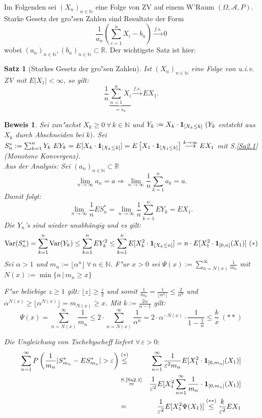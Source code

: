 \documentclass[a4paper,11pt]{book}
\newcommand{\R}{{\mathbb R}}
\newcommand{\N}{{\mathbb N}}
\newcommand{\ind}{\text{\bf{1}}}
\newcommand{\eps}{\varepsilon}
\DeclareMathOperator{\var}{Var}
\def\AA{ \mathcal{A} }
\def\fs{\stackrel{f.s.}{\rightarrow }}
\newtheorem{Sa}{Satz}[chapter]
\theoremstyle{nonumberplain}
\newtheorem{Bew}{Beweis}
\begin{document}
Im Folgenden sei $(X_n)_{n \in \N}$ eine Folge von ZV auf einem W'Raum $(\Omega,\AA,P)$. Starke Gesetz der gro"sen Zahlen sind Resultate der Form
\[
\frac1{a_n} \left( \sum_{i = 1}^{n} X_i -b_n \right) \fs 0
\]
wobei $(a_n)_{n \in \N}, (b_n)_{n \in \N} \subset \R$. Der wichtigste Satz ist hier:

\begin{Sa}[Starkes Gesetz der gro"sen Zahlen] \label{Sa4.2}
Ist $(X_n)_{n \in \N}$ eine Folge von u.i.v. ZV mit $E|X_1| < \infty$, so gilt:
\[
\frac1{n} \underbrace{\sum_{n=1}^n X_i}_{=s_n} \fs EX_1.
\]
\end{Sa}

\begin{Bew}
Sei zun"achst $X_k \geq 0\ \forall\, k \in \N$ und $Y_k := X_k \cdot \ind_{[X_k \leq k]}\ (Y_k$ entsteht aus $X_k$ durch Abschneiden bei $k)$. Sei $S_n^{\ast} := \sum_{k=1}^n Y_k\ EY_k = E[X_k \cdot \ind_{[X_k \leq k]}] = E\left[X_1 \cdot \ind_{[X_1 \leq k]}\right] \stackrel{k \rightarrow \infty}{\longrightarrow} EX_1$ mit S.\ref{Sa2.1} (Monotone Konvergenz).\\
Aus der Analysis: Sei $(a_n)_{n \in \N} \subset \R$
\[
\lim_{n \rightarrow \infty} a_n = a \Rightarrow \lim_{n \rightarrow \infty} \frac1{n} \sum_{k=1}^n a_k = a.
\]
Damit folgt:
\[
\lim_{n \rightarrow \infty} \frac1{n} E S_n^{\ast} = \lim_{n \rightarrow \infty} \frac1{n} \sum_{k=1}^n E Y_k = E X_1.
\]
Die $Y_n$'s sind wieder unabhängig und es gilt:
\[
\var(S_n^{\ast}) = \sum_{k=1}^n \var(Y_k) \leq \sum_{k=1}^n EY_k^2 \leq \sum_{k=1}^n E[X_k^2 \cdot \ind_{[X_k \leq n]}] = n \cdot E[X_1^2 \cdot \ind_{[0,n]}(X_1)] \ (\ast)
\]
Sei $\alpha > 1$ und $m_n := \lfloor \alpha^n \rfloor \ \forall\, n \in \N$. F"ur $x > 0$ sei $\Psi(x) := \sum_{n = N(x)}^{\infty} \frac1{m_n}$ mit $N(x) := \min\{ n \, | \, m_n \geq x \}$

F"ur beliebige $z \geq 1$ gilt: $\lfloor z \rfloor \geq \frac{z}2$ und somit $\frac1{m_n} = \frac1{\lfloor \alpha^n \rfloor} \leq \frac2{\alpha^n}$ und $\alpha^{N(x)} \geq \lfloor \alpha^{N(x)} \rfloor = m_{N(x)} \geq x$. Mit $k := \frac{2\alpha}{\alpha-1}$ gilt:
\[
\Psi(x) = \sum_{n=N(x)}^{\infty} \frac1{m_n} \leq 2 \cdot \sum_{n=N(x)}^{\infty} \frac1{\alpha^n} = 2 \cdot \alpha^{-N(x)} \cdot \frac1{1-\frac1{\alpha}} \leq \frac{k}{x} \ (\ast \ast)
\]

Die Ungleichung von Tschebyscheff liefert $\forall\, \eps > 0:$
\begin{eqnarray*}
\sum_{n=1}^{\infty} P\left( \frac1{m_n} | S_{m_n}^{\ast} - E S_{m_n}^{\ast} | > \eps \right) & \stackrel{(\ast)}{\leq} & \sum_{n=1}^{\infty} \frac1{\eps^2 m_n} E[X_1^2 \cdot \ind_{[0,m_n]}(X_1)] \\
& \stackrel{\text{S.\ref{Sa2.1}}}{=} & \frac1{\eps^2} E[X_1^2 \sum_{n=1}^{\infty} \frac1{m_n} \cdot \ind_{[0,m_x]}(X_1)]\\
& = & \frac1{\eps^2} E[X_1^2 \Psi(X_1)] \stackrel{(\ast \ast)}{\leq} \frac{k}{\eps^2} EX_1
\end{eqnarray*}


\end{Bew}
\end{document}
